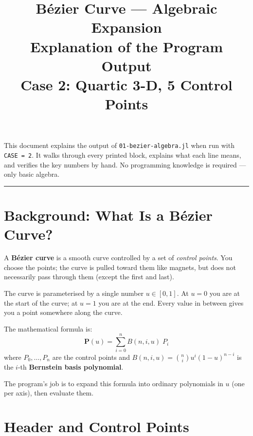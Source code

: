 \documentclass[12pt, a4paper]{article}
\title{%
  \vspace{1cm}
  {\LARGE\bfseries B\'ezier Curve --- Algebraic Expansion}\\[0.4em]
  {\large Explanation of the Program Output}\\[0.4em]
  {\normalsize Case 2: Quartic 3-D, 5 Control Points}
}
\author{}
\date{\DTMtoday}
\newcommand{\cd}[1]{\texttt{#1}}
\begin{document}

\maketitle
\thispagestyle{empty}

\begin{center}
\begin{minipage}{0.85\textwidth}
\small
This document explains the output of \cd{01-bezier-algebra.jl}
when run with \cd{CASE = 2}.
It walks through every printed block, explains what each line means,
and verifies the key numbers by hand.
No programming knowledge is required --- only basic algebra.
\end{minipage}
\end{center}

\vspace{1em}\hrule\vspace{1.5em}
\tableofcontents
\newpage


\section{Background: What Is a B\'ezier Curve?}

A \textbf{B\'ezier curve} is a smooth curve controlled by a set of
\emph{control points}.
You choose the points; the curve is pulled toward them like magnets,
but does not necessarily pass through them (except the first and last).

The curve is parameterised by a single number $u \in [0, 1]$.
At $u = 0$ you are at the start of the curve; at $u = 1$ you are at the end.
Every value in between gives you a point somewhere along the curve.

The mathematical formula is:
\[
  \mathbf{P}(u) = \sum_{i=0}^{n} B(n,i,u)\; P_i
\]
where $P_0, \ldots, P_n$ are the control points and
$B(n,i,u) = \binom{n}{i} u^i (1-u)^{n-i}$
is the $i$-th \textbf{Bernstein basis polynomial}.

The program's job is to expand this formula into ordinary polynomials
in $u$ (one per axis), then evaluate them.


\section{Header and Control Points}
\end{document}
